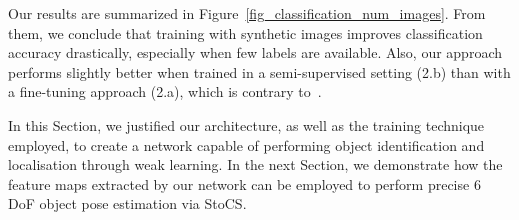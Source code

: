 \documentclass[letterpaper, 10 pt, conference]{ieeeconf}  %
\begin{document}
Our results are summarized in Figure~\ref{fig_classification_num_images}. From them, we conclude that training with synthetic images improves classification accuracy drastically, especially when few labels are available. Also, our approach performs slightly better when trained in a semi-supervised setting (2.b) than with a fine-tuning approach (2.a), which is contrary to~\cite{oliver2018realistic}.

In this Section, we justified our architecture, as well as the training technique employed, to create a network capable of performing object identification and localisation through weak learning. In the next Section, we demonstrate how the feature maps extracted by our network can be employed to perform precise 6 DoF object pose estimation via StoCS.
\end{document}
